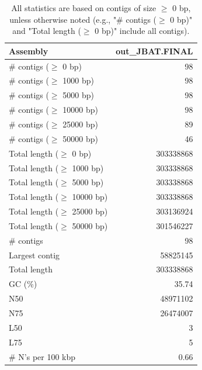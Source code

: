\documentclass[12pt,a4paper]{article}
\begin{document}
\begin{table}[ht]
\begin{center}
\caption{All statistics are based on contigs of size $\geq$ 0 bp, unless otherwise noted (e.g., "\# contigs ($\geq$ 0 bp)" and "Total length ($\geq$ 0 bp)" include all contigs).}
\begin{tabular}{|l*{1}{|r}|}
\hline
Assembly & out\_JBAT.FINAL \\ \hline
\# contigs ($\geq$ 0 bp) & 98 \\ \hline
\# contigs ($\geq$ 1000 bp) & 98 \\ \hline
\# contigs ($\geq$ 5000 bp) & 98 \\ \hline
\# contigs ($\geq$ 10000 bp) & 98 \\ \hline
\# contigs ($\geq$ 25000 bp) & 89 \\ \hline
\# contigs ($\geq$ 50000 bp) & 46 \\ \hline
Total length ($\geq$ 0 bp) & 303338868 \\ \hline
Total length ($\geq$ 1000 bp) & 303338868 \\ \hline
Total length ($\geq$ 5000 bp) & 303338868 \\ \hline
Total length ($\geq$ 10000 bp) & 303338868 \\ \hline
Total length ($\geq$ 25000 bp) & 303136924 \\ \hline
Total length ($\geq$ 50000 bp) & 301546227 \\ \hline
\# contigs & 98 \\ \hline
Largest contig & 58825145 \\ \hline
Total length & 303338868 \\ \hline
GC (\%) & 35.74 \\ \hline
N50 & 48971102 \\ \hline
N75 & 26474007 \\ \hline
L50 & 3 \\ \hline
L75 & 5 \\ \hline
\# N's per 100 kbp & 0.66 \\ \hline
\end{tabular}
\end{center}
\end{table}
\end{document}
